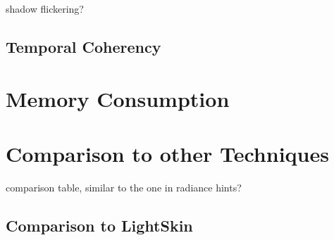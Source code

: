 \documentclass[thesis.tex]{subfiles}
\begin{document}
shadow flickering?

\subsection{Temporal Coherency}


\section{Memory Consumption}

\section{Comparison to other Techniques} \label{sec:eva:comparisiontoother}

comparison table, similar to the one in radiance hints?

\subsection{Comparison to LightSkin}

\subfilebib %
\end{document}
